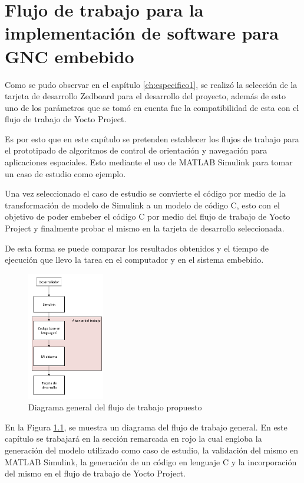 \chapter{Flujo de trabajo para la implementación de software para GNC embebido}
\label{ch:especifico2}

Como se pudo observar en el capítulo \ref{ch:especifico1}, se realizó la selección de la tarjeta de desarrollo Zedboard para el desarrollo del proyecto, además de esto uno de los parámetros que se tomó en cuenta fue la compatibilidad de esta con el flujo de trabajo de Yocto Project.

Es por esto que en este capítulo se pretenden establecer los flujos de trabajo para el prototipado de algoritmos de control de orientación y navegación para aplicaciones espaciales. Esto mediante el uso de MATLAB Simulink para tomar un caso de estudio como ejemplo.

Una vez seleccionado el caso de estudio se convierte el código por medio de la transformación de modelo de Simulink a un modelo de código C, esto con el objetivo de poder embeber el código C por medio del flujo de trabajo de Yocto Project y finalmente probar el mismo en la tarjeta de desarrollo seleccionada.

De esta forma se puede comparar los resultados obtenidos y el tiempo de ejecución que llevo la tarea en el computador y en el sistema embebido.


\begin{figure}[h!]
    \centering
    \includegraphics[width=0.3\textwidth]{fig/especifico_2/Diagrama general del proyecto.pdf}
    \caption{Diagrama general del flujo de trabajo propuesto}
    \label{fig:diagrama_flujo_trabajo}
\end{figure}


En la Figura \ref{fig:diagrama_flujo_trabajo}, se muestra un diagrama del flujo de trabajo general. En este capítulo se trabajará en la sección remarcada en rojo la cual engloba la generación del modelo utilizado como caso de estudio, la validación del mismo en MATLAB Simulink, la generación de un código en lenguaje C y la incorporación del mismo en el flujo de trabajo de Yocto Project.

